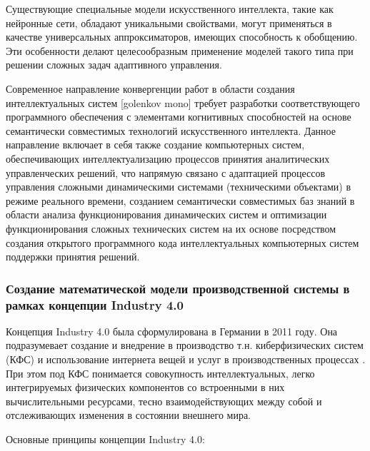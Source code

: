 Существующие специальные модели искусственного интеллекта, такие как нейронные сети, обладают уникальными свойствами, могут применяться в качестве универсальных аппроксиматоров, имеющих способность к обобщению. Эти особенности делают целесообразным применение моделей такого типа при решении сложных задач адаптивного управления.

Современное направление конвергенции работ в области создания интеллектуальных систем [golenkov mono] требует разработки соответствующего программного обеспечения с элементами когнитивных способностей на основе семантически совместимых технологий искусственного интеллекта. Данное направление включает в себя также создание компьютерных систем, обеспечивающих интеллектуализацию процессов принятия аналитических управленческих решений, что напрямую связано с адаптацией процессов управления сложными динамическими системами (техническими объектами) в режиме реального времени, созданием семантически совместимых баз знаний в области анализа функционирования динамических систем и оптимизации функционирования сложных технических систем на их основе посредством создания открытого программного кода интеллектуальных компьютерных систем поддержки принятия решений.



\subsubsection{Создание математической модели производственной системы в рамках концепции Industry 4.0}

Концепция Industry 4.0 была сформулирована в Германии в 2011 году. Она подразумевает создание и внедрение в производство т.н. киберфизических систем (КФС) и использование интернета вещей и услуг в производственных процессах . При этом под КФС понимается совокупность интеллектуальных, легко интегрируемых физических компонентов со встроенными в них вычислительными ресурсами, тесно взаимодействующих между собой и отслеживающих изменения в состоянии внешнего мира.

Основные принципы концепции Industry 4.0:

